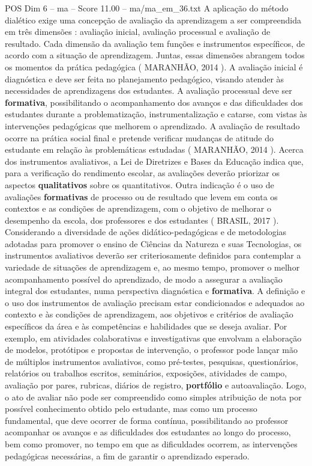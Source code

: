 \begin{textsample}{POS Dim 6 – ma – Score 11.00 – ma/ma\_em\_36.txt}
A aplicação do método dialético exige uma concepção de avaliação da aprendizagem a ser compreendida em três dimensões : avaliação inicial, avaliação processual e avaliação de resultado.
Cada dimensão da avaliação tem funções e instrumentos específicos, de acordo com a situação de aprendizagem.
Juntas, essas dimensões abrangem todos os momentos da prática pedagógica ( MARANHÃO, 2014 ).
A avaliação inicial é diagnóstica e deve ser feita no planejamento pedagógico, visando atender às necessidades de aprendizagens dos estudantes.
A avaliação processual deve ser \textbf{formativa}, possibilitando o acompanhamento dos avanços e das dificuldades dos estudantes durante a problematização, instrumentalização e catarse, com vistas às intervenções pedagógicas que melhorem o aprendizado.
A avaliação de resultado ocorre na prática social final e pretende verificar mudanças de atitude do estudante em relação às problemáticas estudadas ( MARANHÃO, 2014 ).
Acerca dos instrumentos avaliativos, a Lei de Diretrizes e Bases da Educação indica que, para a verificação do rendimento escolar, as avaliações deverão priorizar os aspectos \textbf{qualitativos} sobre os quantitativos.
Outra indicação é o uso de avaliações \textbf{formativas} de processo ou de resultado que levem em conta os contextos e as condições de aprendizagem, com o objetivo de melhorar o desempenho da escola, dos professores e dos estudantes ( BRASIL, 2017 ).
Considerando a diversidade de ações didático-pedagógicas e de metodologias adotadas para promover o ensino de Ciências da Natureza e suas Tecnologias, os instrumentos avaliativos deverão ser criteriosamente definidos para contemplar a variedade de situações de aprendizagem e, ao mesmo tempo, promover o melhor acompanhamento possível do aprendizado, de modo a assegurar a avaliação integral dos estudantes, numa perspectiva diagnóstica e \textbf{formativa}.
A definição e o uso dos instrumentos de avaliação precisam estar condicionados e adequados ao contexto e às condições de aprendizagem, aos objetivos e critérios de avaliação específicos da área e às competências e habilidades que se deseja avaliar.
Por exemplo, em atividades colaborativas e investigativas que envolvam a elaboração de modelos, protótipos e propostas de intervenção, o professor pode lançar mão de múltiplos instrumentos avaliativos, como pré-testes, pesquisas, questionários, relatórios ou trabalhos escritos, seminários, exposições, atividades de campo, avaliação por pares, rubricas, diários de registro, \textbf{portfólio} e autoavaliação.
Logo, o ato de avaliar não pode ser compreendido como simples atribuição de nota por possível conhecimento obtido pelo estudante, mas como um processo fundamental, que deve ocorrer de forma contínua, possibilitando ao professor acompanhar os avanços e as dificuldades dos estudantes ao longo do processo, bem como promover, no tempo em que as dificuldades ocorrem, as intervenções pedagógicas necessárias, a fim de garantir o aprendizado esperado.

\end{textsample}

